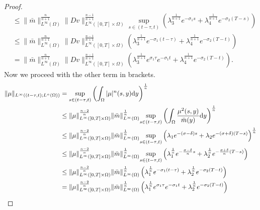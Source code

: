 \documentclass[10pt,a4paper,nouppercase,nowrite]{article}
\numberwithin{equation}{section}
\newcommand{\di}{{\rm d}}
\theoremstyle{definition}
\begin{document}
\begin{proof}
\begin{equation}
\begin{split}
				&\le \| \bar m \|_{L^{\infty}(\Omega)}^{\frac{n}{n+1}} \| Dv \|_{L^{\infty}([0,T] \times \Omega)}^{\frac{n-1}{n+1}} \underset{s \in (t-\tau,t)}{\sup} \left( \lambda_3^{\frac{1}{n+1}} e^{-\sigma_1 s} + \lambda_4^{\frac{1}{n+1}} e^{-\sigma_2(T-s)} \right) \\
				&\le \| \bar m \|_{L^{\infty}(\Omega)}^{\frac{n}{n+1}} \| Dv \|_{L^{\infty}([0,T] \times \Omega)}^{\frac{n-1}{n+1}} \left( \lambda_3^{\frac{1}{n+1}} e^{-\sigma_1(t-\tau)} + \lambda_4^{\frac{1}{n+1}} e^{-\sigma_2(T-t)} \right) \\
				&= \| \bar m \|_{L^{\infty}(\Omega)}^{\frac{n}{n+1}} \| Dv \|_{L^{\infty}([0,T] \times \Omega)}^{\frac{n-1}{n+1}} \left( \lambda_3^{\frac{1}{n+1}} e^{\sigma_1 \tau} e^{-\sigma_1 t} + \lambda_4^{\frac{1}{n+1}} e^{-\sigma_2(T-t)} \right).
				\end{split}
			\end{equation}
			Now we proceed with the other term in brackets.
			\begin{equation} \label{muinterpol}
				\begin{split}
					\| \mu \|_{L^{\infty}((t-\tau,t);L^n(\Omega))} &= \underset{s \in (t-\tau,t)}{\sup} \left( \int_{\Omega} |\mu|^n(s,y) \di y \right)^{\frac{1}{n}} \\
					&\le \| \mu \|_{L^{\infty}([0,T] \times \Omega)}^{\frac{n-2}{n}} \| \bar m \|^{\frac{1}{n}}_{L^{\infty}(\Omega)} \underset{s \in (t-\tau,t)}{\sup} \left( \int_{\Omega} \frac{\mu^2(s,y)}{\bar m(y)} \di y \right)^{\frac{1}{n}} \\
					&\le \| \mu \|_{L^{\infty}([0,T] \times \Omega)}^{\frac{n-2}{n}} \| \bar m \|^{\frac{1}{n}}_{L^{\infty}(\Omega)} \underset{s \in (t-\tau,t)}{\sup} \left( \lambda_1 e^{-(\sigma-\delta)s} + \lambda_2 e^{-(\sigma+\delta)(T-s)} \right)^{\frac{1}{n}} \\
					&\le \| \mu \|_{L^{\infty}([0,T] \times \Omega)}^{\frac{n-2}{n}} \| \bar m \|^{\frac{1}{n}}_{L^{\infty}(\Omega)} \underset{s \in (t-\tau,t)}{\sup} \left( \lambda_1^{\frac{1}{n}} e^{-\frac{\sigma-\delta}{n}s} + \lambda_2^{\frac{1}{n}} e^{-\frac{\sigma+\delta}{n}(T-s)} \right) \\
					&\le \| \mu \|_{L^{\infty}([0,T] \times \Omega)}^{\frac{n-2}{n}} \| \bar m \|^{\frac{1}{n}}_{L^{\infty}(\Omega)} \left( \lambda_1^{\frac{1}{n}} e^{-\sigma_1(t-\tau)} + \lambda_2^{\frac{1}{n}} e^{-\sigma_2(T-t)} \right) \\
					&=\| \mu \|_{L^{\infty}([0,T] \times \Omega)}^{\frac{n-2}{n}} \| \bar m \|^{\frac{1}{n}}_{L^{\infty}(\Omega)} \left( \lambda_1^{\frac{1}{n}} e^{\sigma_1 \tau} e^{-\sigma_1 t} + \lambda_2^{\frac{1}{n}} e^{-\sigma_2(T-t)} \right) \\
				\end{split}
			\end{equation}
	

\end{proof}
\end{document}
